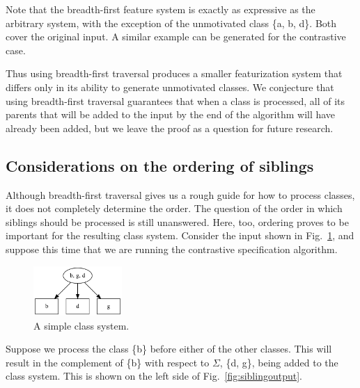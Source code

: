 \documentclass[11pt, oneside]{article}   	%
\begin{document}

Note that the breadth-first feature system is exactly as expressive as the arbitrary system, with the exception of the unmotivated class \{a, b, d\}. Both cover the original input. A similar example can be generated for the contrastive case.

Thus using breadth-first traversal produces a smaller featurization system that differs only in its ability to generate unmotivated classes. We conjecture that using breadth-first traversal guarantees that when a class is processed, all of its parents that will be added to the input by the end of the algorithm will have already been added, but we leave the proof as a question for future research.

\subsection{Considerations on the ordering of siblings}
\label{app:siblings}

Although breadth-first traversal gives us a rough guide for how to process classes, it does not completely determine the order. The question of the order in which siblings should be processed is still unanswered. Here, too, ordering proves to be important for the resulting class system. Consider the input shown in Fig.~\ref{fig:siblinginput}, and suppose this time that we are running the contrastive specification algorithm.

\begin{figure}[htb!]
	\centering
	\includegraphics[width=0.3\textwidth]{sibling_input.png}
	\caption{A simple class system.}
	\label{fig:siblinginput}
\end{figure}

Suppose we process the class \{b\} before either of the other classes. This will result in the complement of \{b\} with respect to $\Sigma$, \{d, g\}, being added to the class system. This is shown on the left side of Fig.~\ref{fig:siblingoutput}.
\end{document}
